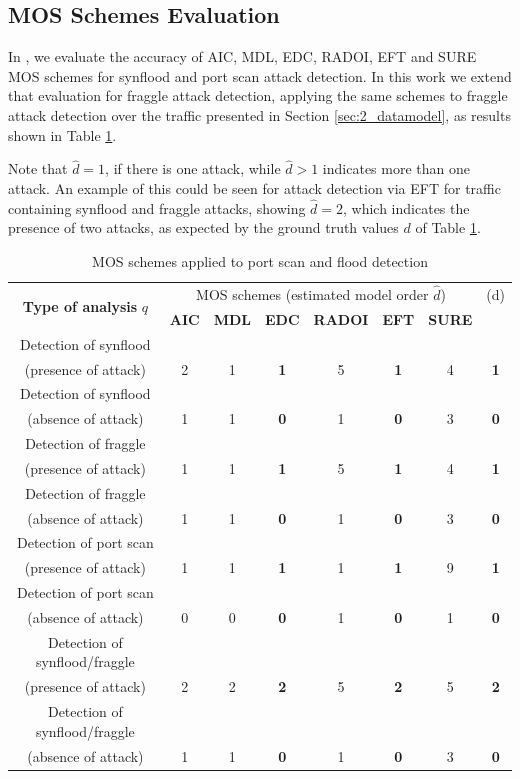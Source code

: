 \subsection{MOS Schemes Evaluation}
\label{sec:2_MOSSchemesEvaluation}

In \cite{tenorio2013greatest}, we evaluate the accuracy of AIC, MDL, EDC, RADOI, EFT and SURE MOS schemes \cite{da2009comparison,tenorio2013greatest} for synflood and port scan attack detection. In this work we extend that evaluation for fraggle attack detection, applying the same schemes to fraggle attack detection over the traffic presented in Section \ref{sec:2_datamodel}, as results shown in Table \ref{tab:2.04}.

Note that $\hat{d} = 1$, if there is one attack, while $\hat{d} > 1$ indicates more than one attack. An example of this could be seen for attack detection via EFT for traffic containing synflood and fraggle attacks, showing $\hat{d} = 2$, which indicates the presence of two attacks, as expected by the ground truth values $d$ of Table \ref{tab:2.04}. 

\begin{table}[h!]
  \centering
  \footnotesize
  \caption{MOS schemes applied to port scan and flood detection}
  \label{tab:2.04}
  \begin{tabular}{ c c c c c c c c }
	\toprule
	\multirow{2}{*}{\textbf{Type of analysis} $q$} &\multicolumn{6}{c}{MOS schemes (estimated model order $\hat{d}$)} &{(d)}\\ 
			\hhline{~------~}
		&\textbf{AIC} &\textbf{MDL} &\textbf{EDC} &\textbf{RADOI} &\textbf{EFT} &\textbf{SURE}\\
	\midrule
	Detection of synflood \\(presence of attack) &2 &1 &\textbf{1} &5 &\textbf{1} &4 &\textbf{1} \\
	Detection of synflood \\(absence of attack) &1 &1 &\textbf{0} &1 &\textbf{0} &3 &\textbf{0} \\
	\midrule
	Detection of fraggle \\(presence of attack) &1 &1 &\textbf{1} &5 &\textbf{1} &4 &\textbf{1} \\
	Detection of fraggle \\(absence of attack) &1 &1 &\textbf{0} &1 &\textbf{0} &3 &\textbf{0} \\
	\midrule
	Detection of port scan \\(presence of attack) &1 &1 &\textbf{1} &1 &\textbf{1} &9 &\textbf{1} \\
	Detection of port scan \\(absence of attack) &0 &0 &\textbf{0} &1 &\textbf{0} &1 &\textbf{0} \\
	\midrule
	Detection of synflood/fraggle \\(presence of attack) &2 &2 &\textbf{2} &5 &\textbf{2} &5 &\textbf{2} \\
	Detection of synflood/fraggle \\(absence of attack) &1 &1 &\textbf{0} &1 &\textbf{0} &3 &\textbf{0} \\
    \bottomrule
  \end{tabular}
\end{table}

